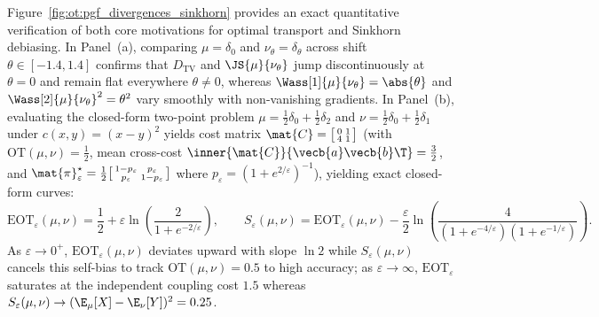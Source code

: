\documentclass[../../../../master.tex]{subfiles}
\begin{document}
Figure~\ref{fig:ot:pgf_divergences_sinkhorn} provides an exact quantitative verification of both core motivations for optimal transport and Sinkhorn debiasing. In Panel~(a), comparing $\mu = \delta_0$ and $\nu_\theta = \delta_\theta$ across shift $\theta \in [-1.4, 1.4]$ confirms that $D_{\mathrm{TV}}$ and $\JS{\mu}{\nu_\theta}$ jump discontinuously at $\theta = 0$ and remain flat everywhere $\theta \ne 0$, whereas $\Wass[1]{\mu}{\nu_\theta} = \abs{\theta}$ and $\Wass[2]{\mu}{\nu_\theta}^2 = \theta^2$ vary smoothly with non-vanishing gradients. In Panel~(b), evaluating the closed-form two-point problem $\mu = \frac{1}{2}\delta_0 + \frac{1}{2}\delta_2$ and $\nu = \frac{1}{2}\delta_0 + \frac{1}{2}\delta_1$ under $c(x,y) = (x-y)^2$ yields cost matrix $\mat{C} = \bigl[\begin{smallmatrix} 0 & 1 \\ 4 & 1 \end{smallmatrix}\bigr]$ (with $\mathrm{OT}(\mu,\nu) = \frac{1}{2}$, mean cross-cost $\inner{\mat{C}}{\vecb{a}\vecb{b}\T} = \frac{3}{2}$, and $\mat{\pi}_\varepsilon^\star = \frac{1}{2}\bigl[\begin{smallmatrix} 1-p_\varepsilon & p_\varepsilon \\ p_\varepsilon & 1-p_\varepsilon \end{smallmatrix}\bigr]$ where $p_\varepsilon = (1 + e^{2/\varepsilon})^{-1}$), yielding exact closed-form curves:
\begin{equation}
\label{eq:ot:two_point_closed}
  \mathrm{EOT}_\varepsilon(\mu,\nu) = \frac{1}{2} + \varepsilon \ln\!\left(\frac{2}{1 + e^{-2/\varepsilon}}\right), \qquad
  S_\varepsilon(\mu,\nu) = \mathrm{EOT}_\varepsilon(\mu,\nu) - \frac{\varepsilon}{2}\ln\!\left(\frac{4}{(1 + e^{-4/\varepsilon})(1 + e^{-1/\varepsilon})}\right).
\end{equation}
As $\varepsilon \to 0^+$, $\mathrm{EOT}_\varepsilon(\mu,\nu)$ deviates upward with slope $\ln 2$ while $S_\varepsilon(\mu,\nu)$ cancels this self-bias to track $\mathrm{OT}(\mu,\nu) = 0.5$ to high accuracy; as $\varepsilon \to \infty$, $\mathrm{EOT}_\varepsilon$ saturates at the independent coupling cost $1.5$ whereas $S_\varepsilon(\mu,\nu) \to (\E_\mu[X] - \E_\nu[Y])^2 = 0.25$.
\end{document}
